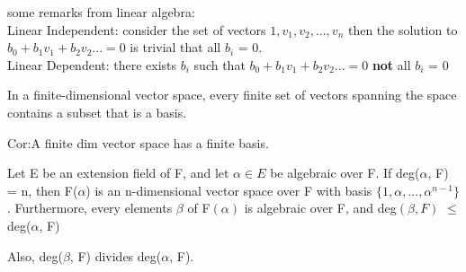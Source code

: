 \documentclass{article}
\begin{document}
\begin{note}
    some remarks from linear algebra: 
\\  Linear Independent: consider the set of vectors ${1, v_1,v_2,..., v_n}$ then the solution to $b_0+b_1v_1+b_2v_2...= 0$ is trivial that all $b_i$ = 0. 
\\ Linear Dependent:  there exists $b_i$ such that $b_0+b_1v_1+b_2v_2...= 0$ \textbf{not} all $b_i$ = 0
\end{note}
\begin{theorem}
    In a finite-dimensional vector space, every finite set of vectors spanning the space contains a subset that is a basis.
\end{theorem}
Cor:A finite dim vector space has a finite basis.
\newpage
\begin{theorem}
    Let E be an extension field of F, and let $\alpha \in E$ be algebraic over F. If deg($\alpha$, F) = n, then  F($\alpha$) is an n-dimensional vector space over F with basis $\{1, \alpha, ..., \alpha^{n-1} \}$. Furthermore, every elements $\beta$ of F$(\alpha)$ is algebraic  over F, and deg$(\beta, F)$ $\leq$ deg($\alpha$, F)
\end{theorem}
\begin{note}
    Also, deg($\beta$, F) divides deg($\alpha$, F).
\end{note}
\end{document}
